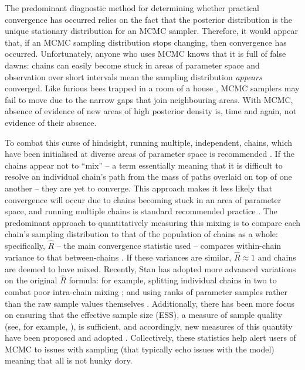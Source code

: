 \documentclass{article}
\begin{document}
The predominant diagnostic method for determining whether practical convergence has occurred relies on the fact that the posterior distribution is the unique stationary distribution for an MCMC sampler. Therefore, it would appear that, if an MCMC sampling distribution stops changing, then convergence has occurred. Unfortunately, anyone who uses MCMC knows that it is full of false dawns: chains can easily become stuck in areas of parameter space and observation over short intervals mean the sampling distribution \textit{appears} converged. Like furious bees trapped in a room of a house \cite{lambertbees}, MCMC samplers may fail to move due to the narrow gaps that join neighbouring areas. With MCMC, absence of evidence of new areas of high posterior density is, time and again, not evidence of their absence.

To combat this curse of hindsight, running multiple, independent, chains, which have been initialised at diverse areas of parameter space is recommended \cite{gelman1992inference}. If the chains appear not to ``mix'' -- a term essentially meaning that it is difficult to resolve an individual chain's path from the mass of paths overlaid on top of one another -- they are yet to converge. This approach makes it less likely that convergence will occur due to chains becoming stuck in an area of parameter space, and running multiple chains is standard recommended practice \cite{lambert2018Student}. The predominant approach to quantitatively measuring this mixing is to compare each chain's sampling distribution to that of the population of chains as a whole: specifically, $\hat{R}$ -- the main convergence statistic used -- compares within-chain variance to that between-chains \cite{gelman2013bayesian}. If these variances are similar, $\hat{R}\approx 1$ and chains are deemed to have mixed. Recently, Stan has adopted more advanced variations on the original $\hat{R}$ formula: for example, splitting individual chains in two to combat poor intra-chain mixing \cite{carpenter2017stan}; and using ranks of parameter samples rather than the raw sample values themselves \cite{vehtari2019rank}. Additionally, there has been more focus on ensuring that the effective sample size (ESS), a measure of sample quality (see, for example, \cite{lambert2018Student}), is sufficient, and accordingly, new measures of this quantity have been proposed \cite{vehtari2019rank} and adopted \cite{carpenter2017stan}. Collectively, these statistics help alert users of MCMC to issues with sampling (that typically echo issues with the model) meaning that all is not hunky dory.
\end{document}
